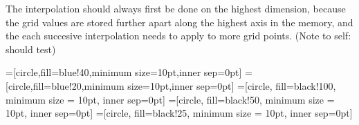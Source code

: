 	The interpolation should always first be done on the highest dimension, because the grid values are stored further
	apart along the highest axis in the memory, and the each succesive interpolation needs to apply to more grid points. (Note to self: should test)

	=[circle,fill=blue!40,minimum size=10pt,inner sep=0pt]
	=[circle,fill=blue!20,minimum size=10pt,inner sep=0pt]
	=[circle, fill=black!100, minimum size = 10pt, inner sep=0pt]
	=[circle, fill=black!50, minimum size = 10pt, inner sep=0pt]
	=[circle, fill=black!25, minimum size = 10pt, inner sep=0pt]


